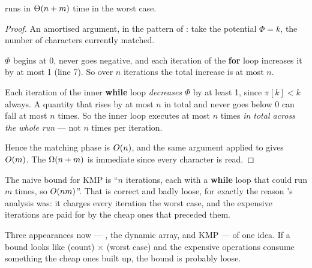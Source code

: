 

\begin{theorem}[KMP]\label{thm:kmp}
 runs in $\Theta(n+m)$ time in the worst case.
\end{theorem}

\begin{proof}
An amortised argument, in the pattern of : take the potential
$\Phi = k$, the number of characters currently matched.

\smallskip
$\Phi$ begins at 0, never goes negative, and each iteration of the
\textbf{for} loop increases it by at most 1 (line 7). So over $n$ iterations
the total increase is at most $n$.

\smallskip
Each iteration of the inner \textbf{while} loop \emph{decreases} $\Phi$ by at
least 1, since $\pi[k] < k$ always. A quantity that rises by at most $n$ in
total and never goes below 0 can fall at most $n$ times. So the inner loop
executes at most $n$ times \emph{in total across the whole run} --- not $n$
times per iteration.

\smallskip
Hence the matching phase is $O(n)$, and the same argument applied to
 gives $O(m)$. The $\Omega(n+m)$ is immediate
since every character is read.
\end{proof}

\begin{conceptbox}
The naive bound for KMP is ``$n$ iterations, each with a \textbf{while} loop
that could run $m$ times, so $O(nm)$''. That is correct and badly loose,
for exactly the reason 's  analysis was:
it charges every iteration the worst case, and the expensive iterations are
paid for by the cheap ones that preceded them.

\smallskip
Three appearances now --- , the dynamic array, and KMP ---
of one idea. If a bound looks like (count) $\times$ (worst case) and the
expensive operations consume something the cheap ones built up, the bound is
probably loose.
\end{conceptbox}

